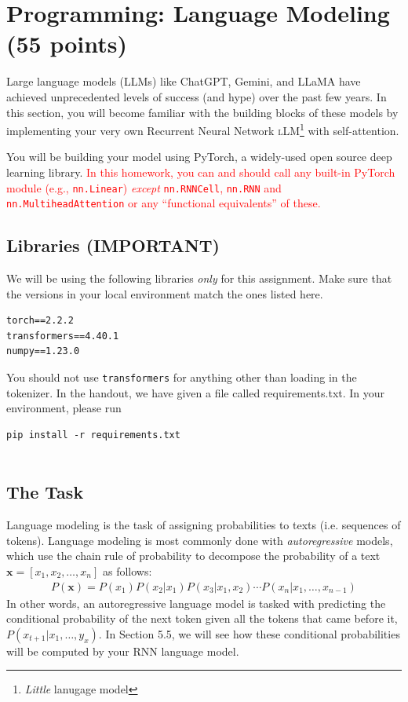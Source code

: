 \documentclass[11pt,addpoints,answers]{exam}
\newcommand{\xv}{\mathbf{x}}
\begin{document}
\newpage
\section{Programming: Language Modeling (55 points)}
\label{programming}

Large language models (LLMs) like ChatGPT, Gemini, and LLaMA have achieved unprecedented levels of success (and hype) over the past few years. In this section, you will become familiar with the building blocks of these models by implementing your very own Recurrent Neural Network \textsc{l}LM\footnote{\textit{Little} lanugage model} with self-attention.

You will be building your model using PyTorch, a widely-used open source deep learning library. \textcolor{red}{In this homework, you can and should call any built-in PyTorch module (e.g., \texttt{nn.Linear}) \textit{except} \texttt{nn.RNNCell}, \texttt{nn.RNN} and \texttt{nn.MultiheadAttention} or any “functional equivalents” of these.}



\subsection{Libraries (IMPORTANT)}

We will be using the following libraries \textit{only} for this assignment. Make sure that the versions in your local environment match the ones listed here.

\begin{lstlisting}
torch==2.2.2
transformers==4.40.1
numpy==1.23.0
\end{lstlisting}

You should not use \texttt{transformers} for anything other than loading in the tokenizer. In the handout, we have given a file called requirements.txt. In your environment, please run \begin{lstlisting}
pip install -r requirements.txt
    
\end{lstlisting}

\subsection{The Task}\label{task}

Language modeling is the task of assigning probabilities to texts (i.e. sequences of tokens). Language modeling is most commonly done with \textit{autoregressive} models, which use the chain rule of probability to decompose the probability of a text $\xv = [ x_1, x_2, \ldots, x_n ]$ as follows:
\begin{align*}
    P(\xv) = P(x_1) P(x_2 | x_1) P(x_3 | x_1, x_2) \cdots P(x_n | x_1,\ldots,x_{n-1})
\end{align*}
In other words, an autoregressive language model is tasked with predicting the conditional probability of the next token given all the tokens that came before it, $P(x_{t+1} | x_1,\ldots,y_{x})$. In Section 5.5, we will see how these conditional probabilities will be computed by your RNN language model.
\end{document}
